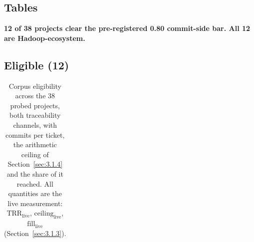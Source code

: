 \documentclass[11pt,a4paper]{article}
\begin{document}
\begin{landscape}

\section*{Tables}




\textbf{12 of 38 projects clear the pre-registered 0.80 commit-side bar. All 12 are Hadoop-ecosystem.}



\subsection*{Eligible (12)}




\begingroup\scriptsize\setlength{\tabcolsep}{3pt}

\begin{longtable}{>{\raggedright\arraybackslash}p{}>{\raggedright\arraybackslash}p{}>{\raggedright\arraybackslash}p{}>{\raggedright\arraybackslash}p{}>{\raggedright\arraybackslash}p{}>{\raggedright\arraybackslash}p{}>{\raggedright\arraybackslash}p{}>{\raggedright\arraybackslash}p{}>{\raggedright\arraybackslash}p{}>{\raggedright\arraybackslash}p{}>{\raggedright\arraybackslash}p{}>{\raggedright\arraybackslash}p{}>{\raggedright\arraybackslash}p{}}

\caption{Corpus eligibility across the 38 probed projects, both traceability channels, with commits per ticket, the arithmetic ceiling of Section~\ref{sec:3.1.4} and the share of it reached. All quantities are the live measurement: $\mathrm{TRR}_\mathrm{live}$, $\mathrm{ceiling}_\mathrm{live}$, $\mathrm{fill}_\mathrm{live}$ (Section~\ref{sec:3.1.3}).}\label{tab:eligibility}\\


\end{longtable}
\end{landscape}
\end{document}
